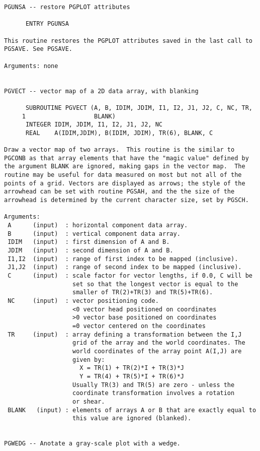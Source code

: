 \begin{small}
\begin{verbatim}
PGUNSA -- restore PGPLOT attributes

      ENTRY PGUNSA

This routine restores the PGPLOT attributes saved in the last call to
PGSAVE. See PGSAVE.

Arguments: none


PGVECT -- vector map of a 2D data array, with blanking

      SUBROUTINE PGVECT (A, B, IDIM, JDIM, I1, I2, J1, J2, C, NC, TR,
     1                   BLANK)
      INTEGER IDIM, JDIM, I1, I2, J1, J2, NC
      REAL    A(IDIM,JDIM), B(IDIM, JDIM), TR(6), BLANK, C

Draw a vector map of two arrays.  This routine is the similar to
PGCONB as that array elements that have the "magic value" defined by
the argument BLANK are ignored, making gaps in the vector map.  The
routine may be useful for data measured on most but not all of the
points of a grid. Vectors are displayed as arrows; the style of the
arrowhead can be set with routine PGSAH, and the the size of the
arrowhead is determined by the current character size, set by PGSCH.

Arguments:
 A      (input)  : horizontal component data array.
 B      (input)  : vertical component data array.
 IDIM   (input)  : first dimension of A and B.
 JDIM   (input)  : second dimension of A and B.
 I1,I2  (input)  : range of first index to be mapped (inclusive).
 J1,J2  (input)  : range of second index to be mapped (inclusive).
 C      (input)  : scale factor for vector lengths, if 0.0, C will be
                   set so that the longest vector is equal to the
                   smaller of TR(2)+TR(3) and TR(5)+TR(6).
 NC     (input)  : vector positioning code.
                   <0 vector head positioned on coordinates
                   >0 vector base positioned on coordinates
                   =0 vector centered on the coordinates
 TR     (input)  : array defining a transformation between the I,J
                   grid of the array and the world coordinates. The
                   world coordinates of the array point A(I,J) are
                   given by:
                     X = TR(1) + TR(2)*I + TR(3)*J
                     Y = TR(4) + TR(5)*I + TR(6)*J
                   Usually TR(3) and TR(5) are zero - unless the
                   coordinate transformation involves a rotation
                   or shear.
 BLANK   (input) : elements of arrays A or B that are exactly equal to
                   this value are ignored (blanked).


PGWEDG -- Anotate a gray-scale plot with a wedge.


\end{verbatim}
\end{small}
